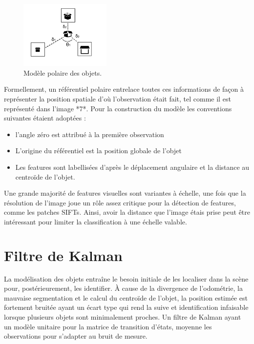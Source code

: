 \begin{figure}[H]
  \centering
  \includegraphics[width=0.4\textwidth]{object_model.png}
  \caption{Modèle polaire des objets.}
\end{figure}

Formellement, un référentiel polaire entrelace toutes ces informations
de façon à représenter la position spatiale d'où l'observation était
fait, tel comme il est représenté dans l'image *7*. Pour la
construction du modèle les conventions suivantes étaient adoptées :
\begin{itemize}
\item l'angle zéro est attribué à la première observation
\item L'origine du référentiel est la position globale de l’objet
\item Les features sont labellisées d'après le déplacement angulaire
  et la distance au centroïde de l'objet.
\end{itemize}

Une grande majorité de features visuelles sont variantes à échelle, une
fois que la résolution de l’image joue un rôle assez critique pour la
détection de features, comme les patches SIFTs. Ainsi, avoir la distance
que l’image étais prise peut être intéressant pour limiter la
classification à une échelle valable.

\section{Filtre de Kalman }

La modélisation des objets entraîne le besoin initiale de les
localiser dans la scène pour, postérieurement, les identifier. À cause
de la divergence de l'odométrie, la mauvaise segmentation et le calcul
du centroïde de l'objet, la position estimée est fortement bruitée
ayant un écart type qui rend la suive et identification infaisable
lorsque plusieurs objets sont minimalement proches. Un filtre de
Kalman ayant un modèle unitaire pour la matrice de transition d'états,
moyenne les observations pour s'adapter au bruit de mesure.


